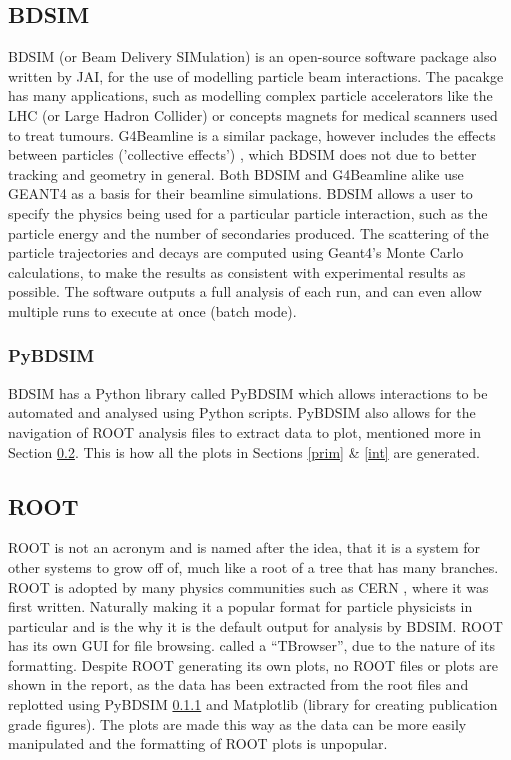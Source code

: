 \documentclass[12pt,a4paper]{article}
\begin{document}
\subsection{BDSIM}
\label{bdsim}
BDSIM (or Beam Delivery SIMulation) is an open-source software package also written by JAI, for the use of modelling particle beam interactions. The pacakge has many applications, such as modelling complex particle accelerators like the LHC (or Large Hadron Collider) or concepts magnets for medical scanners used to treat tumours. G4Beamline \cite{g4beam}is a similar package, however includes the effects between particles ('collective effects') , which BDSIM does not due to better tracking and geometry in general. Both BDSIM and G4Beamline alike use GEANT4 as a basis for their beamline simulations. BDSIM allows a user to specify the physics being used for a particular particle interaction, such as the particle energy and the number of secondaries produced. The scattering of the particle trajectories and decays are computed using Geant4's Monte Carlo calculations, to make the results as consistent with experimental results as possible. The software outputs a full analysis of each run, and can even allow multiple runs to execute at once (batch mode).
\subsubsection{PyBDSIM}
\label{pyb}
BDSIM has a Python library called PyBDSIM which allows interactions to be automated and analysed using Python scripts. PyBDSIM also allows for the navigation of ROOT analysis files to extract data to plot, mentioned more in Section \ref{root}. This is how all the plots in Sections \ref{prim} \& \ref{int} are generated.

\subsection{ROOT}\label{root}
ROOT is not an acronym and is named after the idea, that it is a system for other systems to grow off of, much like a root of a tree that has many branches. ROOT is adopted by many physics communities such as CERN \cite{cern}, where it was first written. Naturally making it a popular format for particle physicists in particular and is the why it is the default output for analysis by BDSIM. ROOT has its own GUI for file browsing. called a ``TBrowser'', due to the nature of its formatting. Despite ROOT generating its own plots, no ROOT files or plots are shown in the report, as the data has been extracted from the root files and replotted using PyBDSIM \ref{pyb} and Matplotlib (library for creating publication grade figures). The plots are made this way as the data can be more easily manipulated and the formatting of ROOT plots is unpopular.
\end{document}
